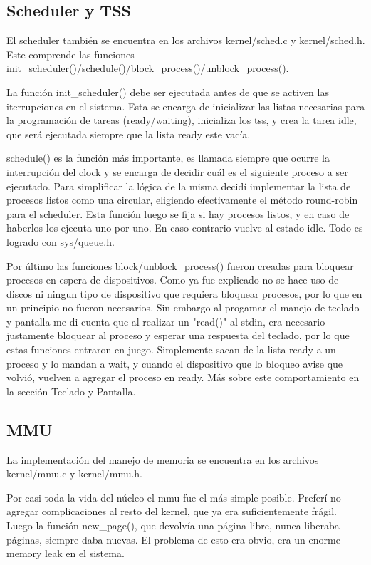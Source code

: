 \subsection{Scheduler y TSS}

El scheduler también se encuentra en los archivos kernel/sched.c y
kernel/sched.h. Este comprende las funciones
init\_scheduler()/schedule()/block\_process()/unblock\_process().

La función init\_scheduler() debe ser ejecutada antes de que se activen las
iterrupciones en el sistema. Esta se encarga de inicializar las listas
necesarias para la programación de tareas (ready/waiting), inicializa los tss,
y crea la tarea idle, que será ejecutada siempre que la lista ready este vacía.

schedule() es la función más importante, es llamada siempre que ocurre la
interrupción del clock y se encarga de decidir cuál es el siguiente proceso a
ser ejecutado. Para simplificar la lógica de la misma decidí implementar la
lista de procesos listos como una circular, eligiendo efectivamente el método
round-robin para el scheduler. Esta función luego se fija si hay procesos
listos, y en caso de haberlos los ejecuta uno por uno. En caso contrario vuelve
al estado idle. Todo es logrado con sys/queue.h.

Por último las funciones block/unblock\_process() fueron creadas para bloquear
procesos en espera de dispositivos. Como ya fue explicado no se hace uso de
discos ni ningun tipo de dispositivo que requiera bloquear procesos, por lo que
en un principio no fueron necesarios. Sin embargo al progamar el manejo de
teclado y pantalla me di cuenta que al realizar un "read()" al stdin, era
necesario  justamente bloquear al proceso y esperar una respuesta del teclado,
por lo que estas funciones entraron en juego. Simplemente sacan de la lista
ready a un proceso y lo mandan a wait, y cuando el dispositivo que lo bloqueo
avise que volvió, vuelven a agregar el proceso en ready. Más sobre este
comportamiento en la sección Teclado y Pantalla.

\subsection{MMU}

La implementación del manejo de memoria se encuentra en los archivos
kernel/mmu.c y kernel/mmu.h.

Por casi toda la vida del núcleo el mmu fue el más simple posible. Preferí no
agregar complicaciones al resto del kernel, que ya era suficientemente frágil.
Luego la función new\_page(), que devolvía una página libre, nunca liberaba
páginas, siempre daba nuevas. El problema de esto era obvio, era un enorme
memory leak en el sistema.

